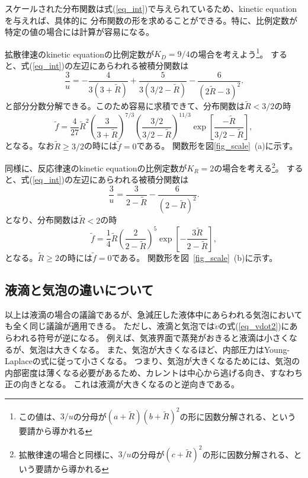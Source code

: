 \documentclass{jarticle}
\begin{document}
スケールされた分布関数は式(\ref{eq_int})で与えられているため、kinetic equationを与えれば、具体的に
分布関数の形を求めることができる。特に、比例定数が特定の値の場合には計算が容易になる。

拡散律速のkinetic equationの比例定数が$K_D = 9/4$の場合を考えよう\footnote{この値は、$3/u$の分母が$(a+\tilde{R})(b + \tilde{R})^2$の形に因数分解される、という要請から導かれる}。
すると、式(\ref{eq_int})の左辺にあらわれる被積分関数は
\begin{equation}
    \frac{3}{u} = - \frac{4}{3 (3 + \tilde{R})} + \frac{5}{3 (3/2 -\tilde{R})} - \frac{6}{(2\tilde{R} -3)^2}.
\end{equation}
と部分分数分解できる。このため容易に求積できて、分布関数は$\tilde{R} <3/2$の時
\begin{equation}
    \tilde{f} = \frac{4}{27} \tilde{R}^2 \left(\frac{3}{3+\tilde{R}}  \right)^{7/3} \left( \frac{3/2}{3/2 - \tilde{R}}\right)^{11/3}
    \exp \left[\frac{-\tilde{R}}{3/2-\tilde{R}} \right], \label{eq_dscale}
\end{equation}
となる。なお$\tilde{R} \ge 3/2$の時には$\tilde{f}=0$である。
関数形を図\ref{fig_scale}~(a)に示す。

同様に、反応律速のkinetic equationの比例定数が$K_R=2$の場合を考える\footnote{拡散律速の場合と同様に、$3/u$の分母が$(c+\tilde{R})^2$の形に因数分解される、という要請から導かれる}。
すると、式(\ref{eq_int})の左辺にあらわれる被積分関数は
\begin{equation}
    \frac{3}{u} =  \frac{3}{2-\tilde{R}} -   \frac{6}{(2- \tilde{R})^2}.
\end{equation}
となり、分布関数は$\tilde{R} <2$の時
\begin{equation}
    \tilde{f} =\frac{1}{4} \tilde{R}\left(\frac{2}{2- \tilde{R}}  \right)^{5}
    \exp \left[- \frac{3 \tilde{R}}{2-\tilde{R}} \right], \label{eq_rscale}
\end{equation}
となる。$\tilde{R} \ge 2$の時には$\tilde{f}=0$である。
関数形を図~\ref{fig_scale}~(b)に示す。


\subsection{液滴と気泡の違いについて}

以上は液滴の場合の議論であるが、急減圧した液体中にあらわれる気泡においても全く同じ議論が適用できる。
ただし、液滴と気泡では$\dot{v}$の式(\ref{eq_vdot2})にあらわれる符号が逆になる。
例えば、気液界面で蒸発がおきると液滴は小さくなるが、気泡は大きくなる。
また、気泡が大きくなるほど、内部圧力はYoung-Laplaceの式に従って小さくなる。
つまり、気泡が大きくなるためには、気泡の内部密度は薄くなる必要があるため、カレントは中心から逃げる向き、すなわち正の向きとなる。
これは液滴が大きくなるのと逆向きである。
\end{document}
